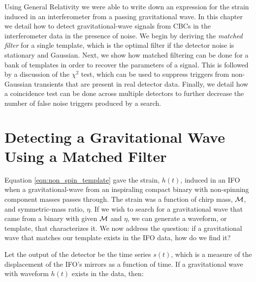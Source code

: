 Using General Relativity we were able to write down an expression for the strain induced in an interferometer from a passing gravitational wave. In this chapter we detail how to detect gravitational-wave signals from \acp{CBC} in the interferometer data in the presence of noise. We begin by deriving the \emph{matched filter} for a single template, which is the optimal filter if the detector noise is stationary and Gaussian. Next, we show how matched filtering can be done for a bank of templates in order to recover the parameters of a signal. This is followed by a discussion of the $\chi^2$ test, which can be used to suppress triggers from non-Gaussian transients that are present in real detector data. Finally, we detail how a coincidence test can be done across multiple detectors to further decrease the number of false noise triggers produced by a search.

\section{Detecting a Gravitational Wave Using a Matched Filter}
\label{sec:matched_filter}

Equation \ref{eqn:non_spin_template} gave the strain, $h(t)$, induced in an \ac{IFO} when a gravitational-wave from an inspiraling compact binary with non-spinning component masses passes through. The strain was a function of chirp mass, $\mathcal{M}$, and symmetric-mass ratio, $\eta$. If we wish to search for a gravitational wave that came from a binary with given $\mathcal{M}$ and $\eta$, we can generate a waveform, or template, that characterizes it. We now address the question: if a gravitational wave that matches our template exists in the \ac{IFO} data, how do we find it?

Let the output of the detector be the time series $s(t)$, which is a measure of the displacement of the \ac{IFO}'s mirrors as a function of time. If a gravitational wave with waveform $h(t)$ exists in the data, then:

